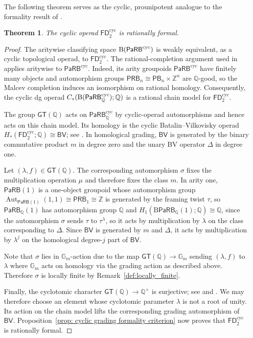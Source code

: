\documentclass{amsart}
\newcommand{\PaRB}{\mathsf{PaRB}}
\newcommand{\BV}{\mathsf{BV}}
\newcommand{\Aut}{\operatorname{Aut}}
\newcommand{\cs}{\textnormal{B}}
\newcommand{\gt}{\mathsf{GT}}
\newcommand{\PB}{\mathsf{PB}} %
\newcommand{\PRB}{\mathsf{PRB}} %
\newtheorem{thm}[theorem]{Theorem}%
\theoremstyle{definition}
\numberwithin{equation}{section}
\begin{document}
The following theorem serves as the cyclic, prounipotent analogue to the formality result of
\cite[Theorem~9.1]{Boavida-Horel-Robertson}.

\begin{thm}
\label{thm: cyclic formality framed little disks}
The cyclic operad $\mathsf{FD}_2^{\mathrm{cyc}}$ is rationally
formal.
\end{thm}

\begin{proof}
The aritywise classifying space
$\cs(\PaRB^{\mathrm{cyc}})$ is weakly equivalent, as a cyclic
topological operad, to $\mathsf{FD}_2^{\mathrm{cyc}}$. The
rational-completion argument used in
\cite[Theorem~9.1]{Boavida-Horel-Robertson} applies aritywise to
$\PaRB^{\mathrm{cyc}}$. Indeed, its arity groupoids $\PaRB^{\mathrm{cyc}}$ have finitely
many objects and automorphism groups
$\PRB_n\cong\PB_n\times\mathbb Z^n$ are $\mathbb{Q}$-good, so the Malcev
completion induces an isomorphism on rational homology. Consequently,
the cyclic dg operad
$C_\ast(\cs(\PaRB_{\mathbb Q}^{\mathrm{cyc}});\mathbb Q)$ is a
rational chain model for $\mathsf{FD}_2^{\mathrm{cyc}}$.

The group $\gt(\mathbb Q)$ acts on
$\PaRB_{\mathbb Q}^{\mathrm{cyc}}$ by cyclic-operad automorphisms and
hence acts on this chain model. Its homology is the cyclic
Batalin--Vilkovisky operad
$H_\ast(\mathsf{FD}_2^{\mathrm{cyc}};\mathbb Q)\cong\BV$; see
\cite{getzler_framed_discs}. In homological grading, $\BV$ is
generated by the binary commutative product $m$ in degree zero and
the unary BV operator $\Delta$ in degree one.

Let $(\lambda,f)\in\gt(\mathbb Q)$. The corresponding automorphism $\sigma$ fixes the multiplication operation $\mu$ and therefore fixes the
class $m$. In arity one, $\PaRB(1)$ is a one-object groupoid whose automorphism group $\Aut_{\PaRB(1)}(1,1)\cong \PRB_1 \cong \mathbb Z$ is generated by the framing twist $\tau$, so $\PaRB_{\mathbb Q}(1)$ has automorphism group $\mathbb Q$ and $H_1(\mathrm{B}\PaRB_{\mathbb Q}(1);\mathbb Q)\cong\mathbb Q$, since the automorphism $\sigma$ sends $\tau$ to
$\tau^\lambda$, so it acts by multiplication by $\lambda$ on the
class corresponding to $\Delta$. Since $\BV$ is generated by $m$
and $\Delta$, it acts by multiplication by $\lambda^j$ on the
homological degree-$j$ part of $\BV$. 


Note that $\sigma$ lies in $\mathbb G_m$-action due to the map $\gt(\mathbb Q) \rightarrow \mathbb G_m$ sending $(\lambda,f)$ to $\lambda$ where $\mathbb G_m$ acts on homology via the grading action as described above. Therefore $\sigma$ is locally finite by Remark~\ref{def:locally_finite}.

Finally, the cyclotomic character
$\gt(\mathbb Q)\to\mathbb Q^\times$ is surjective; see
\cite[Section~5]{Drin} and \cite{petersen_formality}. We may
therefore choose an element whose cyclotomic parameter $\lambda$ is not a root
of unity. Its action on the chain model lifts the corresponding
grading automorphism of $\BV$. Proposition~\ref{prop: cyclic grading
formality criterion} now proves that
$\mathsf{FD}_2^{\mathrm{cyc}}$ is rationally formal.
\end{proof}



\end{document}
